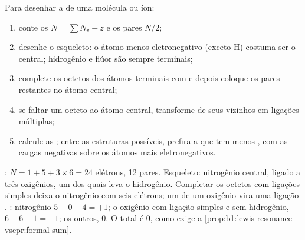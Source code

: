 \begin{method}\label{met:b1:lewis-resonance-vsepr:lewis}
Para desenhar a  de uma molécula ou íon:
\begin{enumerate}
  \item conte os  $N = \sum N_v - z$ e os pares $N/2$;
  \item desenhe o esqueleto: o átomo menos eletronegativo (exceto H)
        costuma ser o central; hidrogênio e flúor são sempre terminais;
  \item complete os octetos dos átomos terminais com 
        e depois coloque os pares restantes no átomo central;
  \item se faltar um octeto ao átomo central, transforme  de seus vizinhos em ligações múltiplas;
  \item calcule as ; entre as estruturas possíveis,
        prefira a que tem menos , com as cargas negativas
        sobre os átomos mais eletronegativos.
\end{enumerate}
\end{method}

\begin{example}\label{ex:b1:lewis-resonance-vsepr:hno3}
: $N = 1 + 5 + 3 \times 6 = 24$ elétrons, 12 pares. Esqueleto:
nitrogênio central, ligado a três oxigênios, um dos quais leva o
hidrogênio. Completar os octetos com ligações simples deixa o nitrogênio
com seis elétrons; um  de um oxigênio vira uma ligação
. : nitrogênio $5 - 0 - 4 = +1$; o oxigênio com
ligação simples e sem hidrogênio, $6 - 6 - 1 = -1$; os outros, 0. O total
é 0, como exige a \cref{prop:b1:lewis-resonance-vsepr:formal-sum}.
\end{example}

